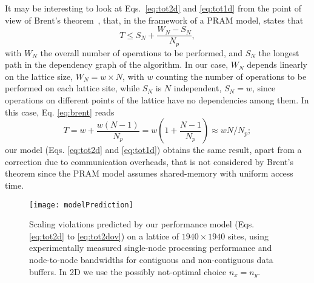 \documentclass{elsarticle}
\begin{document}
It may be interesting to look at Eqs.~\ref{eq:tot2d} and \ref{eq:tot1d} from the 
point of view of Brent's theorem~\cite{brent}, that, in the framework of a PRAM model, 
states that
%
\begin{equation}
T \le S_N + \frac{W_N - S_N}{N_p},  
\label{eq:brent}
\end{equation}
%
with $W_N$ the overall number of operations to be performed, and $S_N$ the longest 
path in the dependency graph of the algorithm. In our case, $W_N$ depends 
linearly on the lattice size, $W_N = w\times N$, with $w$ counting the number 
of operations to be performed on each lattice site, while $S_N$ is $N$ independent, 
$S_N = w$, since operations on different points of the lattice have no dependencies 
among them. In this case, Eq. \ref{eq:brent} reads
%
\begin{equation}
T = w + \frac{w(N -1)}{N_p} = w(1+\frac{N-1}{N_p}) \approx w N/N_p;
\end{equation}
%
our model (Eqs. \ref{eq:tot2d} and \ref{eq:tot1d}) obtains the same result, 
apart from a correction due to communication overheads, that is not considered 
by Brent's theorem since the PRAM model assumes shared-memory with uniform 
access time.
 
\begin{figure}
\centering
\texttt{[image: modelPrediction]}
\caption{Scaling violations predicted by our performance model
(Eqs. \ref{eq:tot2d} to \ref{eq:tot2dov}) on a lattice of $1940 \times 1940$ 
sites, using experimentally measured single-node processing performance and
node-to-node bandwidths for contiguous and non-contiguous data buffers. 
In 2D we use the possibly not-optimal choice $n_x = n_y$. }
\label{plot:model}
\end{figure}
\end{document}
